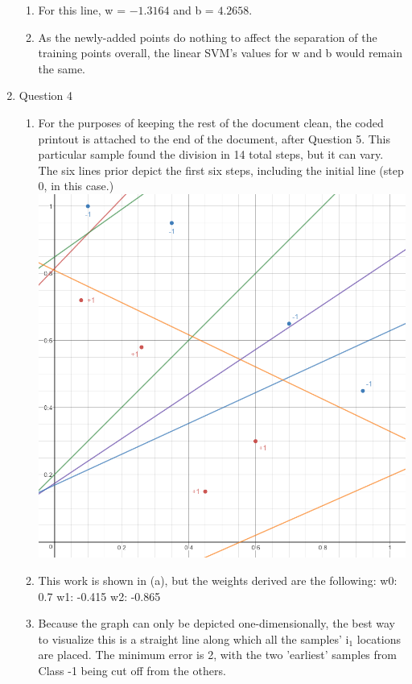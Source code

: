 \documentclass[11pt]{article}
\begin{document}
\begin{enumerate}
\begin {enumerate}
\item For this line, w = ${-1.3164}$ and b = ${\text{4.2658}}$.
\item As the newly-added points do nothing to affect the separation of the training points overall, the linear SVM's values for w and b would remain the same.
\end {enumerate}
\item Question 4
\begin {enumerate}
\item
For the purposes of keeping the rest of the document clean, the coded printout is attached to the end of the document, after Question 5. This particular sample found the division in 14 total steps, but it can vary. \newline
The six lines prior depict the first six steps, including the initial line (step 0, in this case.) \newline
\includegraphics[scale=0.4]{graph1}
\item
This work is shown in (a), but the weights derived are the following: \newline
w0: 0.7 w1: -0.415 w2: -0.865
\item
Because the graph can only be depicted one-dimensionally, the best way to visualize this is a straight line along which all the samples' i$_{\text{1}}$ locations are placed. The minimum error is 2, with the two 'earliest' samples from Class -1 being cut off from the others. \newline

\end{enumerate}
\end{enumerate}
\end{document}
